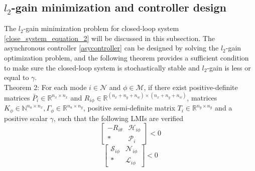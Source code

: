\documentclass[conference]{IEEEtran}
\begin{document}
\subsection{$l_2$-gain minimization and controller design}
The $l_2$-gain minimization problem for closed-loop system \eqref{close_system_equation_2} will be discussed in this subsection. The asynchronous controller \eqref{asycontroller} can be designed by solving the $l_2$-gain optimization problem, and the following theorem provides a sufficient condition to make sure the closed-loop system is stochastically stable and $l_2$-gain is less or equal to $\gamma$.\\
Theorem 2: For each mode $i\in\mathcal{N}$ and $\phi\in\mathcal{M}$, if there exist positive-definite matrices $\bar{P}_{i}\in\mathbb{R}^{n_x\times n_x}$ and $R_{i\phi}\in \mathbb{R}^{(n_x+n_y+n_w)\times(n_x+n_y+n_w)}$, matrices $K_{\phi}\in\mathbb{N}^{n_u\times n_x}, \varGamma_{\phi}\in \mathbb{R}^{n_u\times n_y}$, positive semi-definite matrix $T_{i}\in\mathbb{R}^{n_y\times n_y}$ and a positive scalar $\gamma$, such that the following LMIs are verified
\begin{equation} \label{condition_2_1}
	\begin{bmatrix}
	-R_{i\theta}&\mathscr{H}_{i\phi}\\
	*&\mathscr{P}_{i}
	\end{bmatrix}<0
\end{equation}
\begin{equation} \label{condition_2_2}
	\begin{bmatrix}
	\mathscr{S}_{i\phi}&\mathscr{N}_{i\phi}\\
	*&\mathscr{L}_{i\phi}
	\end{bmatrix}<0
\end{equation}

\end{document}
